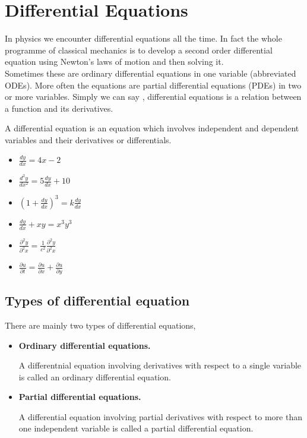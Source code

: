 \chapter{Differential Equations}
In physics we encounter differential equations all the time. In fact the whole programme of classical mechanics is to develop a second order differential equation using Newton's laws of motion and then solving it.\\Sometimes these are ordinary
differential equations in one variable (abbreviated ODEs). More often the equations are
partial differential equations (PDEs) in two or more variables. Simply we can say , differential equations is a relation between a function and its derivatives.
\begin{definition}
	A differential equation is an equation which involves independent and dependent variables and their derivatives or differentials.
\end{definition}
\begin{example}
	\hspace{1cm}
\begin{itemize}
		\item $\frac{dy}{dx}={4x-2}$
		\item $\frac{d^{2}y}{dx^{2}}=5\frac{dy}{dx}+10$
		\item $(1+\frac{dy}{dx})^{3}=k\frac{dy}{dx}$
		\item $\frac{dy}{dx}+xy=x^{3}y^{3}$
		\item $\frac{\partial^{2}y}{\partial^{2} x}=\frac{1}{c^{2}} \frac{\partial^{2}y}{\partial^{2} x} $
		\item $\frac{\partial u}{\partial t}=\frac{\partial u}{\partial x}+\frac{\partial u}{\partial y}$
	\end{itemize}
\end{example}
\section{{Types of differential equation}}
There are mainly two types of differential equations,
	\begin{itemize}
	\item \textbf{Ordinary differential equations.}\par A differentnial equation involving derivatives with respect to a single variable is called an ordinary differential equation. 
	\item \textbf{Partial differential equations.}\par A differential equation involving partial derivatives with respect to more than one independent variable is called a partial differential equation.
	\end{itemize}
